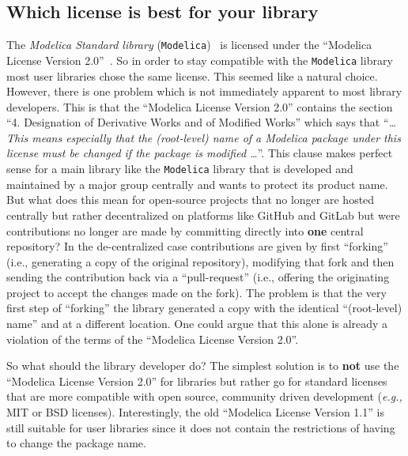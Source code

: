 \documentclass[11pt,a4paper,twocolumn]{article}
\begin{document}
\subsection{Which license is best for your library}
The \emph{Modelica Standard library}
(\texttt{Modelica})~\parencite{MSL} is licensed under the ``Modelica
License Version 2.0''~\parencite{MoLic2}. So in order to stay
compatible with the \texttt{Modelica} library most user libraries
chose the same license. This seemed like a natural choice. However,
there is one problem which is not immediately apparent to most library
developers. This is that the ``Modelica License Version 2.0'' contains
the section ``4. Designation of Derivative Works and of Modified
Works'' which says that ``\emph{\ldots This means especially that the
  (root-level) name of a Modelica package under this license must be
  changed if the package is modified \ldots}''.  This clause makes
perfect sense for a main library like the \texttt{Modelica} library
that is developed and maintained by a major group centrally and wants
to protect its product name.  But what does this mean for open-source
projects that no longer are hosted centrally but rather decentralized
on platforms like GitHub and GitLab but were contributions no longer
are made by committing directly into \textbf{one} central repository?
In the de-centralized case contributions are given by first
``forking'' (i.e., generating a copy of the original repository),
modifying that fork and then sending the contribution back via a
``pull-request'' (i.e., offering the originating project to accept the
changes made on the fork).  The problem is that the very first step of
``forking'' the library generated a copy with the identical
``(root-level) name'' and at a different location. One could argue
that this alone is already a violation of the terms of the ``Modelica
License Version 2.0''.

So what should the library developer do? The simplest solution is to
\textbf{not} use the ``Modelica License Version 2.0'' for libraries
but rather go for standard licenses~\parencite{lic} that are more
compatible with open source, community driven development (\emph{e.g.,}
MIT or BSD licenses). Interestingly, the old ``Modelica License
Version 1.1'' is still suitable for user libraries since it does not
contain the restrictions of having to change the package name.
\end{document}
